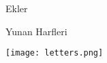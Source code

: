\documentclass[12pt,fleqn]{article}\usepackage{../../common}
\begin{document}
Ekler

Yunan Harfleri

\texttt{[image: letters.png]}
\end{document}
